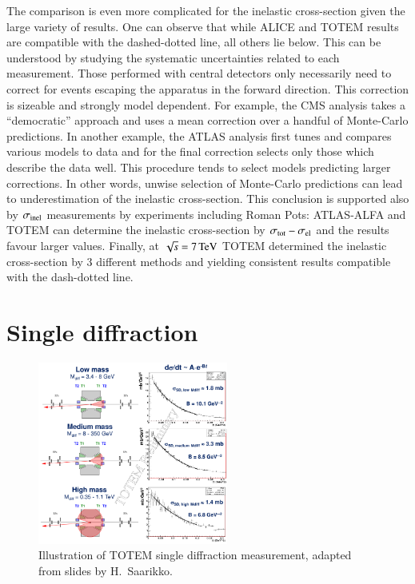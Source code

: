 \documentclass{webofc}
\def\un#1{\,{\rm #1}}
\begin{document}
The comparison is even more complicated for the inelastic cross-section given the large variety of results. One can observe that while ALICE and TOTEM results are compatible with the dashed-dotted line, all others lie below. This can be understood by studying the systematic uncertainties related to each measurement. Those performed with central detectors only necessarily need to correct for events escaping the apparatus in the forward direction. This correction is sizeable and strongly model dependent. For example, the CMS analysis \cite{cms-inel-13tev} takes a ``democratic'' approach and uses a mean correction over a handful of Monte-Carlo predictions. In another example, the ATLAS analysis \cite{atlas-inel-13tev} first tunes and compares various models to data and for the final correction selects only those which describe the data well. This procedure tends to select models predicting larger corrections. In other words, unwise selection of Monte-Carlo predictions can lead to underestimation of the inelastic cross-section. This conclusion is supported also by $\sigma_{\rm inel}$ measurements by experiments including Roman Pots: ATLAS-ALFA and TOTEM can determine the inelastic cross-section by $\sigma_{\rm tot} - \sigma_{\rm el}$ and the results favour larger values. Finally, at $\sqrt s = 7\un{TeV}$ TOTEM determined the inelastic cross-section by 3 different methods \cite{totem-si-tot-7tev} and yielding consistent results compatible with the dash-dotted line.


\section{Single diffraction}
\label{s:sd}

\begin{figure}[h]
\centering
\includegraphics[height=6cm,clip]{fig/sd_7TeV.png}
\vskip-4mm
\caption{Illustration of TOTEM single diffraction measurement, adapted from slides by H.~Saarikko.}
\label{f:sd TOTEM}
\end{figure}
\end{document}
